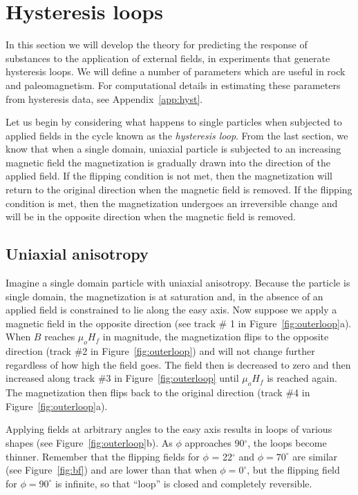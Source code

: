 \section{Hysteresis loops}

In this section we will develop the theory for predicting  the response of substances to the application of external fields, in experiments that generate hysteresis loops.  We will define a number of parameters which are useful in rock and paleomagnetism.   For computational details in estimating these parameters from hysteresis data, see Appendix~\ref{app:hyst}.

Let us begin by considering  what happens to single particles when subjected to applied fields in the cycle known as the
{\it hysteresis loop}.   From the last section,  we know that when a single domain, uniaxial particle is subjected to an increasing magnetic field the magnetization is gradually drawn into the direction of the applied field.  If the flipping condition is not  met, then the magnetization will return to the original direction when the magnetic field is removed.  If the flipping condition is met, then the magnetization undergoes an irreversible change and will be  in the opposite direction when the magnetic field is removed.       




\subsection{Uniaxial anisotropy}
\label{sect:uniaxial}

Imagine a single domain particle with 
uniaxial anisotropy.   Because the particle is single domain, the magnetization is at saturation and, in  the absence of an applied field is constrained to lie along the easy axis.  Now suppose we apply a magnetic field in the opposite direction (see track \# 1 in  Figure~\ref{fig:outerloop}a).  When $B$ reaches $\mu_oH_f$ in magnitude, the magnetization flips to the opposite direction (track \#2 in  Figure~\ref{fig:outerloop}) and will not change further regardless of how high the field goes.  The field then is decreased to zero and then increased along track \#3 in  Figure~\ref{fig:outerloop} until $\mu_oH_f$ is reached again.  The magnetization then flips back to the original direction (track \#4 in  Figure~\ref{fig:outerloop}a).    




Applying fields at arbitrary angles to the easy axis results in loops of various shapes (see Figure~\ref{fig:outerloop}b).   As $\phi$ approaches 90$^{\circ}$, the loops become thinner.  Remember that the flipping fields for $\phi$ = 22$^{\circ}$ and $\phi = 70^{\circ}$ are similar (see Figure~\ref{fig:bf}) and are lower than that when $\phi=0^{\circ}$, but the flipping field for $\phi = 90^{\circ}$ is infinite, so that ``loop'' is closed and completely reversible.  


